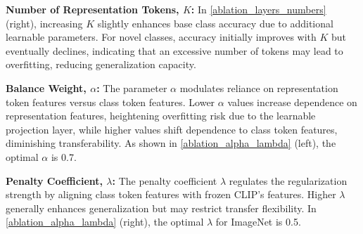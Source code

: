 \noindent \textbf{Number of Representation Tokens, $K$:} In \cref{ablation_layers_numbers} (right), increasing $K$ slightly enhances base class accuracy due to additional learnable parameters. For novel classes, accuracy initially improves with $K$ but eventually declines, indicating that an excessive number of tokens may lead to overfitting, reducing generalization capacity.


\noindent \textbf{Balance Weight, $\alpha$:} The parameter $\alpha$ modulates reliance on representation token features versus class token features. Lower $\alpha$ values increase dependence on representation features, heightening overfitting risk due to the learnable projection layer, while higher values shift dependence to class token features, diminishing transferability. As shown in \cref{ablation_alpha_lambda} (left), the optimal $\alpha$ is 0.7.

\noindent \textbf{Penalty Coefficient, $\lambda$:}  The penalty coefficient $\lambda$ regulates the regularization strength by aligning class token features with frozen CLIP’s features. Higher $\lambda$ generally enhances generalization but may restrict transfer flexibility. In \cref{ablation_alpha_lambda} (right), the optimal $\lambda$ for ImageNet is 0.5.



